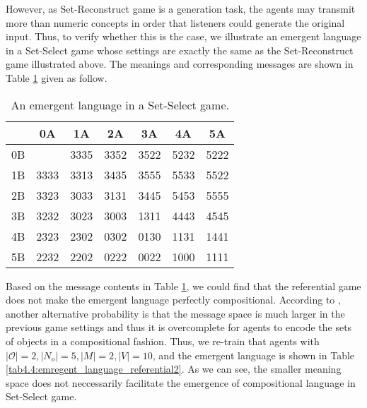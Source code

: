 However, as Set-Reconstruct game is a generation task, the agents may transmit more than numeric concepts in order that listeners could generate the original input. Thus, to verify whether this is the case, we illustrate an emergent language in a Set-Select game whose settings are exactly the same as the Set-Reconstruct game illustrated above. The meanings and corresponding messages are shown in Table \ref{tab4.3:emregent_language_referential} given as follow.

\begin{table}[!h]
    \centering
    \begin{tabular}{|c|c|c|c|c|c|c|}
        \hline
           & 0A   & 1A   & 2A   & 3A   & 4A   & 5A   \\ \hline
        0B &      & 3335 & 3352 & 3522 & 5232 & 5222 \\ \hline
        1B & 3333 & 3313 & 3435 & 3555 & 5533 & 5522 \\ \hline
        2B & 3323 & 3033 & 3131 & 3445 & 5453 & 5555 \\ \hline
        3B & 3232 & 3023 & 3003 & 1311 & 4443 & 4545 \\ \hline
        4B & 2323 & 2302 & 0302 & 0130 & 1131 & 1441 \\ \hline
        5B & 2232 & 2202 & 0222 & 0022 & 1000 & 1111 \\ \hline
        \end{tabular}
    \caption{An emergent language in a Set-Select game.}
    \label{tab4.3:emregent_language_referential}
\end{table}

Based on the message contents in Table \ref{tab4.3:emregent_language_referential}, we could find that the referential game does not make the emergent language perfectly compositional. According to \cite{kottur2017natural}, another alternative probability is that the message space is much larger in the previous game settings and thus it is overcomplete for agents to encode the sets of objects in a compositional fashion. Thus, we re-train that agents with $|\mathcal{O}|=2, |N_o|=5, |M|=2, |V|=10$, and the emergent language is shown in Table \ref{tab4.4:emregent_language_referential2}. As we can see, the smaller meaning space does not neccessarily facilitate the emergence of compositional language in Set-Select game.

